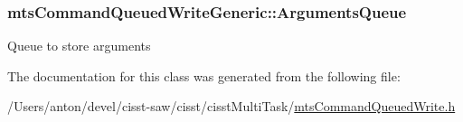 \subsubsection[{Arguments\+Queue}]{ mts\+Command\+Queued\+Write\+Generic\+::\+Arguments\+Queue\hspace{0.3cm}{\ttfamily [protected]}}\label{classmts_command_queued_write_generic_aed20ecad144f2e1aa6d26ba37e71e3ea}
Queue to store arguments 

The documentation for this class was generated from the following file\+:\begin{DoxyCompactItemize}
\item 
/\+Users/anton/devel/cisst-\/saw/cisst/cisst\+Multi\+Task/\hyperlink{mts_command_queued_write_8h}{mts\+Command\+Queued\+Write.\+h}\end{DoxyCompactItemize}
